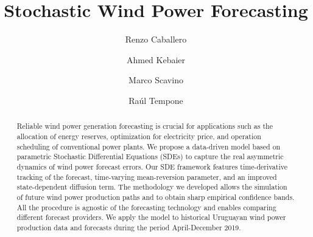 \documentclass[11pt]{article}
\theoremstyle{definition}
\begin{document}
\title{ Stochastic Wind Power Forecasting }  %

\author[1]{Renzo Caballero}
\author[2]{Ahmed Kebaier}
\author[3]{Marco Scavino}
\author[4]{ Ra\'ul  Tempone}


\maketitle


\begin{abstract}

Reliable wind power generation forecasting is crucial for applications such as the allocation of energy reserves, optimization for electricity price, and operation scheduling of conventional power plants. We propose a data-driven model based on parametric Stochastic Differential Equations (SDEs) to capture the real asymmetric dynamics of wind power forecast errors. Our SDE framework features time-derivative tracking of the forecast, time-varying mean-reversion parameter, and an improved state-dependent diffusion term. The methodology we developed allows the simulation of future wind power production paths and to obtain sharp empirical confidence bands. All the procedure is agnostic of the forecasting technology and enables comparing different forecast providers. We apply the model to historical Uruguayan wind power production data and forecasts during the period April-December 2019.

\end{abstract}
\end{document}
